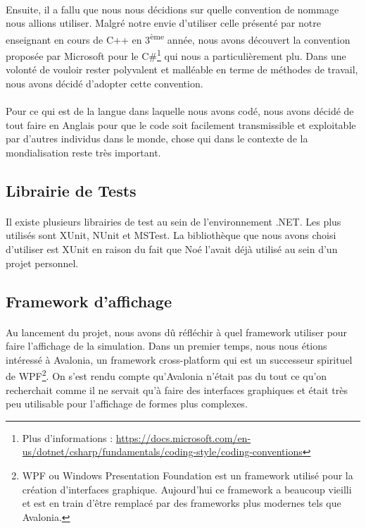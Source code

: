 \documentclass{EPUProjetDi}
\begin{document}
\paragraph{}
Ensuite, il a fallu que nous nous décidions sur quelle convention de nommage nous allions utiliser. 
Malgré notre envie d'utiliser celle présenté par notre enseignant en cours de C++ en 3\textsuperscript{ème} année, nous avons découvert la convention 
proposée par Microsoft pour le C\#\footnote{Plus d'informations : \url{https://docs.microsoft.com/en-us/dotnet/csharp/fundamentals/coding-style/coding-conventions}} qui nous a particulièrement plu.
Dans une volonté de vouloir rester polyvalent et malléable en terme de méthodes de travail, nous avons décidé d'adopter cette convention.

\paragraph{}
Pour ce qui est de la langue dans laquelle nous avons codé, nous avons décidé de tout faire en Anglais pour que le code soit facilement
transmissible et exploitable par d'autres individus dans le monde, chose qui dans le contexte de la mondialisation reste très important.

\subsection{Librairie de Tests}

\paragraph{}
Il existe plusieurs librairies de test au sein de l'environnement .NET. Les plus utilisés sont XUnit, NUnit et MSTest.
La bibliothèque que nous avons choisi d'utiliser est XUnit en raison du fait que Noé l'avait déjà utilisé au sein d'un projet personnel.

\subsection{Framework d'affichage}

\paragraph{}
Au lancement du projet, nous avons dû réfléchir à quel framework utiliser pour faire l'affichage de la simulation.
Dans un premier temps, nous nous étions intéressé à Avalonia, un framework cross-platform qui est un successeur spirituel de WPF\footnote{WPF ou Windows Presentation Foundation est un framework 
utilisé pour la création d'interfaces graphique. Aujourd'hui ce framework a beaucoup vieilli et est en train d'être remplacé par des frameworks plus modernes tels que Avalonia.}.
On s'est rendu compte qu'Avalonia n'était pas du tout ce qu'on recherchait comme il ne servait qu'à faire des interfaces graphiques et était très peu utilisable pour l'affichage de formes plus complexes.
\end{document}
